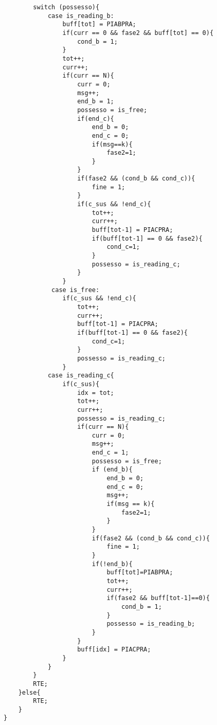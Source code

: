\documentclass{article}
\begin{document}
\begin{lstlisting}
        switch (possesso){
            case is_reading_b:
                buff[tot] = PIABPRA;
                if(curr == 0 && fase2 && buff[tot] == 0){
                    cond_b = 1;
                }
                tot++;
                curr++;
                if(curr == N){
                    curr = 0;
                    msg++;
                    end_b = 1;
                    possesso = is_free;
                    if(end_c){
                        end_b = 0;
                        end_c = 0;
                        if(msg==k){
                            fase2=1;
                        }
                    }
                    if(fase2 && (cond_b && cond_c)){
                        fine = 1;
                    }
                    if(c_sus && !end_c){
                        tot++;
                        curr++;
                        buff[tot-1] = PIACPRA;
                        if(buff[tot-1] == 0 && fase2){
                            cond_c=1;
                        }
                        possesso = is_reading_c;
                    }
                }
             case is_free:
                if(c_sus && !end_c){
                    tot++;
                    curr++;
                    buff[tot-1] = PIACPRA;
                    if(buff[tot-1] == 0 && fase2){
                        cond_c=1;
                    }
                    possesso = is_reading_c;
                }
            case is_reading_c{
                if(c_sus){
                    idx = tot;
                    tot++;
                    curr++;
                    possesso = is_reading_c;
                    if(curr == N){
                        curr = 0;
                        msg++;
                        end_c = 1;
                        possesso = is_free;
                        if (end_b){
                            end_b = 0;
                            end_c = 0;
                            msg++;
                            if(msg == k){
                                fase2=1;
                            }
                        }
                        if(fase2 && (cond_b && cond_c)){
                            fine = 1;
                        }
                        if(!end_b){
                            buff[tot]=PIABPRA;
                            tot++;
                            curr++;
                            if(fase2 && buff[tot-1]==0){
                                cond_b = 1;
                            }
                            possesso = is_reading_b;
                        }
                    }
                    buff[idx] = PIACPRA;
                }
            }
        }   
        RTE;
    }else{
        RTE;
    }
}
\end{lstlisting}
\newpage
\end{document}
